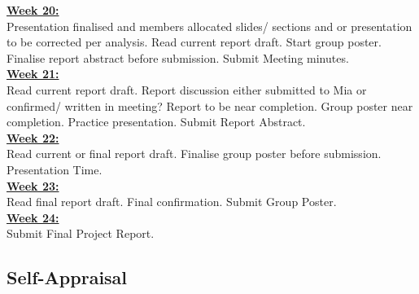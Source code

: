 \documentclass[12pt]{article}
\begin{document}
\textbf{\underline{Week 20:}} \\ [0.2cm]
Presentation finalised and members allocated slides/ sections and or presentation to be corrected per analysis. Read current report draft. Start group poster. Finalise report abstract before submission. Submit Meeting minutes. \\

\textbf{\underline{Week 21:}} \\ [0.2cm]
Read current report draft. Report discussion either submitted to Mia or confirmed/ written in meeting? Report to be near completion. Group poster near completion. Practice presentation. Submit Report Abstract. \\

\textbf{\underline{Week 22:}} \\ [0.2cm]
Read current or final report draft. Finalise group poster before submission. Presentation Time. \\

\textbf{\underline{Week 23:}} \\ [0.2cm]
Read final report draft. Final confirmation. Submit Group Poster. \\


\textbf{\underline{Week 24:}} \\ [0.2cm]
Submit Final Project Report.

\subsection{Self-Appraisal}

\end{document}
